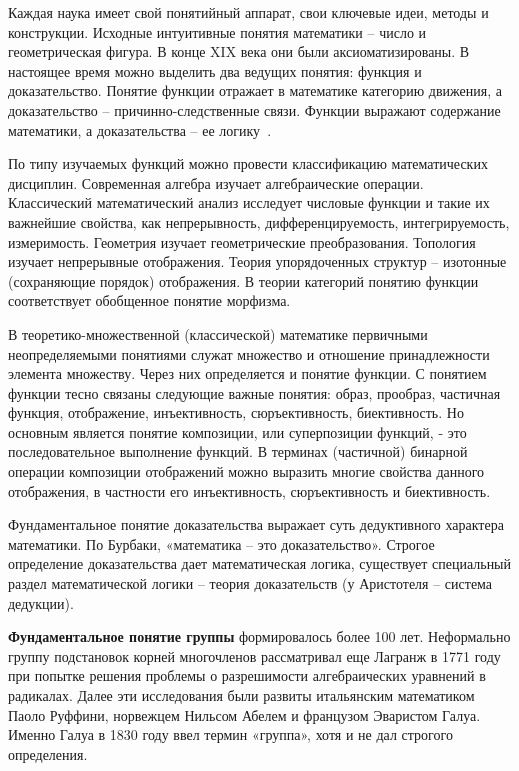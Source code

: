 Каждая наука имеет свой понятийный аппарат, свои ключевые идеи, методы и конструкции. Исходные интуитивные понятия математики – число и геометрическая фигура. В конце XIX века они были аксиоматизированы. В настоящее время можно выделить два ведущих понятия: функция и доказательство. Понятие функции отражает в математике категорию движения, а доказательство – причинно-следственные связи. Функции выражают содержание математики, а доказательства – ее логику~\cite{ахмедов2021определение}.

По типу изучаемых функций можно провести классификацию математических дисциплин. Современная алгебра изучает алгебраические операции. Классический математический анализ исследует числовые функции и такие их важнейшие свойства, как непрерывность, дифференцируемость, интегрируемость, измеримость. Геометрия изучает геометрические преобразования. Топология изучает непрерывные отображения. Теория упорядоченных структур – изотонные (сохраняющие порядок) отображения. В теории категорий понятию функции соответствует обобщенное понятие морфизма.

В теоретико-множественной (классической) математике первичными неопределяемыми понятиями служат множество и отношение принадлежности элемента множеству. Через них определяется и понятие функции. С понятием функции тесно связаны следующие важные понятия: образ, прообраз, частичная функция, отображение, инъективность, сюръективность, биективность. Но основным является понятие композиции, или суперпозиции функций, - это последовательное выполнение функций. В терминах (частичной) бинарной операции композиции отображений можно выразить многие свойства данного отображения, в частности его инъективность, сюръективность и биективность.

Фундаментальное понятие доказательства выражает суть дедуктивного характера математики. По Бурбаки, «математика – это доказательство». Строгое определение доказательства дает математическая логика, существует специальный раздел математической логики – теория доказательств (у Аристотеля – система дедукции).

\textbf{Фундаментальное понятие группы} формировалось более 100 лет. Неформально группу подстановок корней многочленов рассматривал еще Лагранж в 1771 году при попытке решения проблемы о разрешимости алгебраических уравнений в радикалах. Далее эти исследования были развиты итальянским математиком Паоло Руффини, норвежцем Нильсом Абелем и французом Эваристом Галуа. Именно Галуа в 1830 году ввел термин «группа», хотя и не дал строгого определения.

